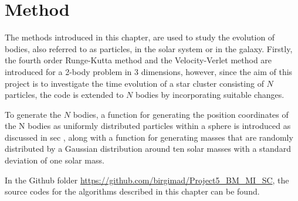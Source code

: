 \chapter{Method}
\label{chap:method} 
The methods introduced in this chapter, are used to study the evolution of bodies, also referred to as particles, in the solar system or in the galaxy. 
Firstly, the fourth order Runge-Kutta method and the Velocity-Verlet method are introduced for a 2-body problem in 3 dimensions, however, since the aim of this project is to investigate the time evolution of a star cluster consisting of $N$ particles, the code is extended to $N$ bodies by incorporating suitable changes. 

To generate the $N$ bodies, a function for generating the position coordinates of the N bodies as uniformly distributed particles within a sphere is introduced as discussed in sec , along with a function for generating masses that are randomly distributed by a Gaussian distribution around ten solar masses with a standard deviation of one solar mass.

In the Github folder \url{https://github.com/birgimad/Project5_BM_MI_SC}, the source codes for the algorithms described in this chapter can be found. 

